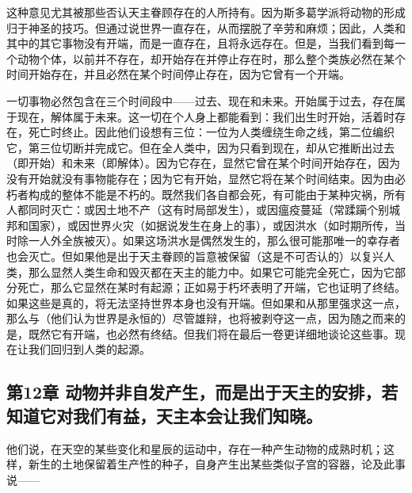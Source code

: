 \par

这种意见尤其被那些否认天主眷顾存在的人所持有。因为斯多葛学派将动物的形成归于神圣的技巧。但通过说世界一直存在，从而摆脱了辛劳和麻烦；因此，人类和其中的其它事物没有开端，而是一直存在，且将永远存在。但是，当我们看到每一个动物个体，以前并不存在，却开始存在并停止存在时，那么整个类族必然在某个时间开始存在，并且必然在某个时间停止存在，因为它曾有一个开端。\par

一切事物必然包含在三个时间段中——过去、现在和未来。开始属于过去，存在属于现在，解体属于未来。这一切在个人身上都能看到：我们出生时开始，活着时存在，死亡时终止。因此他们设想有三位：一位为人类缠绕生命之线，第二位编织它，第三位切断并完成它。但在全人类中，因为只看到现在，却从它推断出过去（即开始）和未来（即解体）。因为它存在，显然它曾在某个时间开始存在，因为没有开始就没有事物能存在；因为它有开始，显然它将在某个时间结束。因为由必朽者构成的整体不能是不朽的。既然我们各自都会死，有可能由于某种灾祸，所有人都同时灭亡：或因土地不产（这有时局部发生），或因瘟疫蔓延（常蹂躏个别城邦和国家），或因世界火灾（如据说发生在身上的事），或因洪水（如时期所传，当时除一人外全族被灭）。如果这场洪水是偶然发生的，那么很可能那唯一的幸存者也会灭亡。但如果他是出于天主眷顾的旨意被保留（这是不可否认的）以复兴人类，那么显然人类生命和毁灭都在天主的能力中。如果它可能完全死亡，因为它部分死亡，那么它显然在某时有起源；正如易于朽坏表明了开端，它也证明了终结。如果这些是真的，将无法坚持世界本身也没有开端。但如果和从那里强求这一点，那么与（他们认为世界是永恒的）尽管雄辩，也将被剥夺这一点，因为随之而来的是，既然它有开端，也必然有终结。但我们将在最后一卷更详细地谈论这些事。现在让我们回归到人类的起源。\par


\subsection{第12章 动物并非自发产生，而是出于天主的安排，若知道它对我们有益，天主本会让我们知晓。}

他们说，在天空的某些变化和星辰的运动中，存在一种产生动物的成熟时机；这样，新生的土地保留着生产性的种子，自身产生出某些类似子宫的容器，论及此事说——\par

